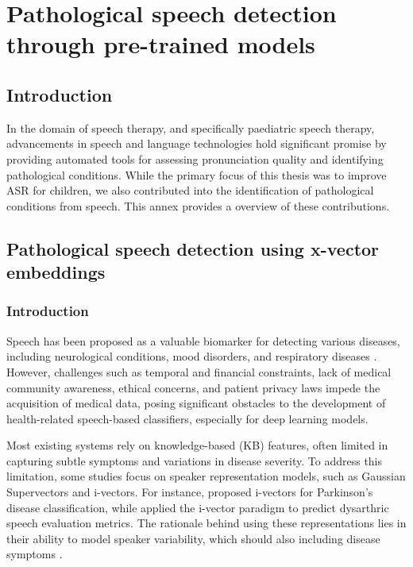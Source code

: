 \chapter{Pathological speech detection through pre-trained models}
\label{chapter:appendixA}

\section{Introduction}
In the domain of speech therapy, and specifically paediatric speech therapy, advancements in speech and language technologies hold significant promise by providing automated tools for assessing pronunciation quality and identifying pathological conditions. While the primary focus of this thesis was to improve ASR for children, we also contributed into the identification of pathological conditions from speech. This annex provides a overview of these contributions.


\section{Pathological speech detection using x-vector embeddings}
\subsection{Introduction}
Speech has been proposed as a valuable biomarker for detecting various diseases, including neurological conditions, mood disorders, and respiratory diseases \cite{hauptman2019identifying,botelho2019speech}. However, challenges such as temporal and financial constraints, lack of medical community awareness, ethical concerns, and patient privacy laws impede the acquisition of medical data, posing significant obstacles to the development of health-related speech-based classifiers, especially for deep learning models.

Most existing systems rely on knowledge-based (KB) features, often limited in capturing subtle symptoms and variations in disease severity. To address this limitation, some studies focus on speaker representation models, such as Gaussian Supervectors and i-vectors. For instance, \cite{hauptman2019identifying} proposed i-vectors for Parkinson's disease classification, while \cite{laaridh17_interspeech} applied the i-vector paradigm to predict dysarthric speech evaluation metrics. The rationale behind using these representations lies in their ability to model speaker variability, which should also including disease symptoms \cite{hauptman2019identifying}.

